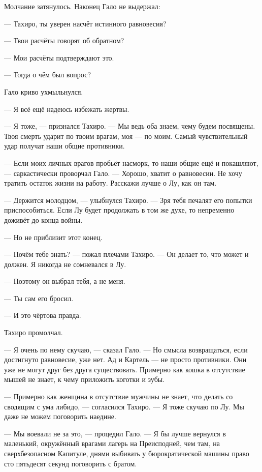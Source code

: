 \textspace

Молчание затянулось.
Наконец Гало не выдержал:

--- Тахиро, ты уверен насчёт истинного равновесия?

--- Твои расчёты говорят об обратном?

--- Мои расчёты подтверждают это.

--- Тогда о чём был вопрос?

Гало криво ухмыльнулся.

--- Я всё ещё надеюсь избежать жертвы.

--- Я тоже, --- признался Тахиро.
--- Мы ведь оба знаем, чему будем посвящены.
Твоя смерть ударит по твоим врагам, моя --- по моим.
Самый чувствительный удар получат наши общие противники.

--- Если моих личных врагов пробьёт насморк, то наши общие ещё и покашляют, --- саркастически проворчал Гало.
--- Хорошо, хватит о равновесии.
Не хочу тратить остаток жизни на работу.
Расскажи лучше о Лу, как он там.

--- Держится молодцом, --- улыбнулся Тахиро.
--- Зря тебя печалят его попытки приспособиться.
Если Лу будет продолжать в том же духе, то непременно доживёт до конца войны.

--- Но не приблизит этот конец.

--- Почём тебе знать? --- пожал плечами Тахиро.
--- Он делает то, что может и должен.
Я никогда не сомневался в Лу.

--- Поэтому он выбрал тебя, а не меня.

--- Ты сам его бросил.

--- И это чёртова правда.

Тахиро промолчал.

--- Я очень по нему скучаю, --- сказал Гало.
--- Но смысла возвращаться, если достигнуто равновесие, уже нет.
Ад и Картель --- не просто противники.
Они уже не могут друг без друга существовать.
Примерно как кошка в отсутствие мышей не знает, к чему приложить коготки и зубы.

--- Примерно как женщина в отсутствие мужчины не знает, что делать со сводящим с ума либидо, --- согласился Тахиро.
--- Я тоже скучаю по Лу.
Мы даже не можем поговорить наедине.

--- Мы воевали не за это, --- процедил Гало.
--- Я бы лучше вернулся в маленький, окружённый врагами лагерь на Преисподней, чем там, на сверхбезопасном Капитуле, днями выбивать у бюрократической машины право сто пятьдесят секунд поговорить с братом.

